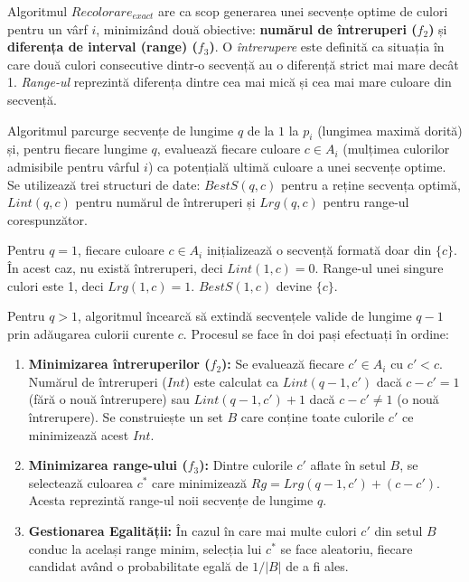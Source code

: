 \vspace{1cm}

Algoritmul $Recolorare_{exact}$ are ca scop generarea unei secvențe optime de culori pentru un vârf $i$, minimizând două obiective: \textbf{numărul de întreruperi ($f_2$)} și \textbf{diferența de interval (range) ($f_3$)}. O \textit{întrerupere} este definită ca situația în care două culori consecutive dintr-o secvență au o diferență strict mai mare decât 1. \textit{Range-ul} reprezintă diferența dintre cea mai mică și cea mai mare culoare din secvență.

Algoritmul parcurge secvențe de lungime $q$ de la $1$ la $p_i$ (lungimea maximă dorită) și, pentru fiecare lungime $q$, evaluează fiecare culoare $c \in A_i$ (mulțimea culorilor admisibile pentru vârful $i$) ca potențială ultimă culoare a unei secvențe optime. Se utilizează trei structuri de date: $BestS(q, c)$ pentru a reține secvența optimă, $Lint(q, c)$ pentru numărul de întreruperi și $Lrg(q, c)$ pentru range-ul corespunzător.

Pentru $q = 1$, fiecare culoare $c \in A_i$ inițializează o secvență formată doar din $\{c\}$. În acest caz, nu există întreruperi, deci $Lint(1, c) = 0$. Range-ul unei singure culori este 1, deci $Lrg(1, c) = 1$. $BestS(1, c)$ devine $\{c\}$.


Pentru $q > 1$, algoritmul încearcă să extindă secvențele valide de lungime $q-1$ prin adăugarea culorii curente $c$. Procesul se face în doi pași efectuați în ordine:
\begin{enumerate}
    \item \textbf{Minimizarea întreruperilor ($f_2$):} Se evaluează fiecare $c' \in A_i$ cu $c' < c$. Numărul de întreruperi ($Int$) este calculat ca $Lint(q-1, c')$ dacă $c - c' = 1$ (fără o nouă întrerupere) sau $Lint(q-1, c') + 1$ dacă $c - c' \neq 1$ (o nouă întrerupere). Se construiește un set $B$ care conține toate culorile $c'$ ce minimizează acest $Int$.
    \item \textbf{Minimizarea range-ului ($f_3$):} Dintre culorile $c'$ aflate în setul $B$, se selectează culoarea $c^*$ care minimizează $Rg = Lrg(q-1, c') + (c - c')$. Acesta reprezintă range-ul noii secvențe de lungime $q$.
    \item \textbf{Gestionarea Egalității:} În cazul în care mai multe culori $c'$ din setul $B$ conduc la același range minim, selecția lui $c^*$ se face aleatoriu, fiecare candidat având o probabilitate egală de $1/|B|$ de a fi ales.
\end{enumerate}
    
